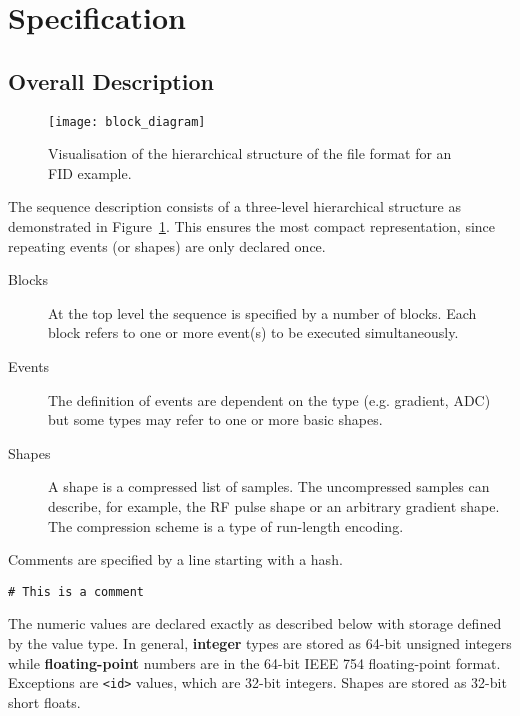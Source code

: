 \documentclass{article}
\begin{document}
\section{Specification}\label{sec:specification}

\subsection{Overall Description}

\begin{figure}[H]
\texttt{[image: block\_diagram]}
\caption{Visualisation of the hierarchical structure of the file format for an FID example. \label{fig:block_diagram}}
\end{figure}

The sequence description consists of a three-level hierarchical structure as demonstrated in Figure~\ref{fig:block_diagram}. This ensures the most compact representation, since repeating events (or shapes) are only declared once.
\begin{description}
\item[Blocks] At the top level the sequence is specified by a number of blocks. Each block refers to one or more event(s) to be executed simultaneously.
\item[Events] The definition of events are dependent on the type (e.g. gradient, ADC) but some types may refer to one or more basic shapes.
\item[Shapes] A shape is a compressed list of samples. The uncompressed samples can describe, for example, the RF pulse shape or an arbitrary gradient shape. The compression scheme is a type of run-length encoding.
\end{description}

Comments are specified by a line starting with a hash.
\begin{lstlisting}
# This is a comment
\end{lstlisting}

The numeric values are declared exactly as described below with storage defined by the value type. In general, \textbf{integer} types are stored as 64-bit unsigned integers while \textbf{floating-point} numbers are in the 64-bit IEEE 754 floating-point format. Exceptions are \verb.<id>. values, which are 32-bit integers. Shapes are stored as 32-bit short floats.
\end{document}
